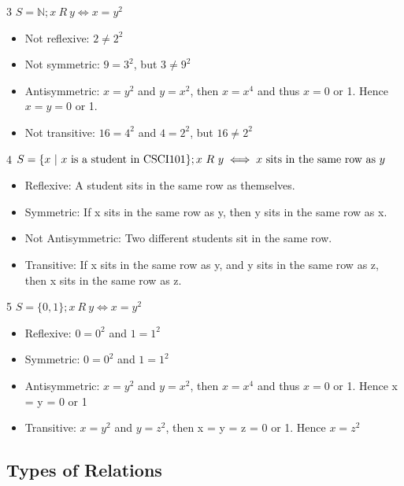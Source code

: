 \documentclass[12pt, letterpaper]{article}
\newcommand{\exheader}[1][ex]{{\tiny{#1}\normalsize}}
\begin{document}
\bigbreak

\exheader[3] $S = \mathbb{N}; x\ R\ y \iff x = y^2$\
\begin{itemize}[leftmargin=*, label={}]
	\item Not reflexive: $2 \not = 2^2$
	\item Not symmetric: $9 = 3^2$, but $3 \not = 9^2$
	\item Antisymmetric: $x = y^2$ and $y = x^2$, then $x=x^4$ and thus $x = 0$ or 1. Hence $x = y = 0$ or 1.
	\item Not transitive: $16 = 4^2$ and $4 = 2^2$, but $16 \not = 2^2$
\end{itemize}

\bigbreak

\exheader[4] $S = \{x \ | \ x \textnormal{ is a student in CSCI101}\}; x\ R\ y \iff x \textnormal{ sits in the same row as } y$
\begin{itemize}[leftmargin=*, label={}]
	\item Reflexive: A student sits in the same row as themselves.
	\item Symmetric: If x sits in the same row as y, then y sits in the same row as x.
	\item Not Antisymmetric: Two different students sit in the same row.
	\item Transitive: If x sits in the same row as y, and y sits in the same row as z, then x sits in the same row as z.
\end{itemize}

\bigbreak

\exheader[5] $S = \{0,1\}; x\ R\ y \iff x = y^2$
\begin{itemize}[leftmargin=*, label={}]
	\item Reflexive: $0 = 0^2$ and $1 = 1^2$
	\item Symmetric: $0 = 0^2$ and $1 = 1^2$
	\item Antisymmetric: $x = y^2$ and $y = x^2$, then $x = x^4$ and thus $x = 0$ or 1. Hence x = y = 0 or 1
	\item Transitive: $x = y^2$ and $ y = z^2$, then x = y = z = 0 or 1. Hence $x = z^2$
\end{itemize}

\pagebreak

\subsection{Types of Relations}
\end{document}
